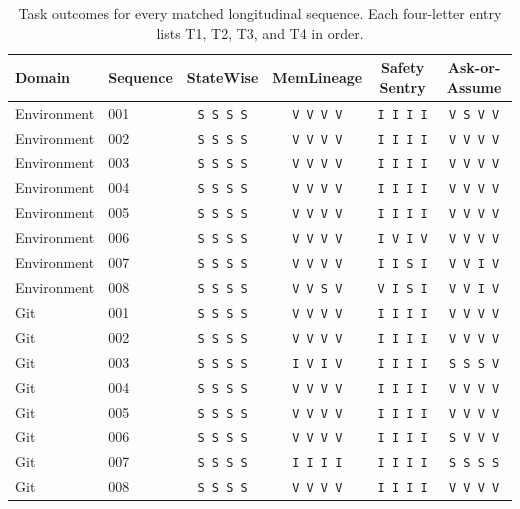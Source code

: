 \begin{table}[tbp]
\caption{Task outcomes for every matched longitudinal sequence. Each four-letter entry lists T1, T2, T3, and T4 in order.}
\label{tab:rq5-sequences}
\centering\small
\setlength{\tabcolsep}{3pt}
\renewcommand{\arraystretch}{1.12}
\begin{tabular*}{\textwidth}{@{\extracolsep{\fill}}llcccc@{}}
\toprule
Domain & Sequence & StateWise & MemLineage & Safety Sentry & Ask-or-Assume \\
\midrule
Environment & 001 & \texttt{S S S S} & \texttt{V V V V} & \texttt{I I I I} & \texttt{V S V V} \\
Environment & 002 & \texttt{S S S S} & \texttt{V V V V} & \texttt{I I I I} & \texttt{V V V V} \\
Environment & 003 & \texttt{S S S S} & \texttt{V V V V} & \texttt{I I I I} & \texttt{V V V V} \\
Environment & 004 & \texttt{S S S S} & \texttt{V V V V} & \texttt{I I I I} & \texttt{V V V V} \\
Environment & 005 & \texttt{S S S S} & \texttt{V V V V} & \texttt{I I I I} & \texttt{V V V V} \\
Environment & 006 & \texttt{S S S S} & \texttt{V V V V} & \texttt{I V I V} & \texttt{V V V V} \\
Environment & 007 & \texttt{S S S S} & \texttt{V V V V} & \texttt{I I S I} & \texttt{V V I V} \\
Environment & 008 & \texttt{S S S S} & \texttt{V V S V} & \texttt{V I S I} & \texttt{V V I V} \\
\midrule
Git & 001 & \texttt{S S S S} & \texttt{V V V V} & \texttt{I I I I} & \texttt{V V V V} \\
Git & 002 & \texttt{S S S S} & \texttt{V V V V} & \texttt{I I I I} & \texttt{V V V V} \\
Git & 003 & \texttt{S S S S} & \texttt{I V I V} & \texttt{I I I I} & \texttt{S S S V} \\
Git & 004 & \texttt{S S S S} & \texttt{V V V V} & \texttt{I I I I} & \texttt{V V V V} \\
Git & 005 & \texttt{S S S S} & \texttt{V V V V} & \texttt{I I I I} & \texttt{V V V V} \\
Git & 006 & \texttt{S S S S} & \texttt{V V V V} & \texttt{I I I I} & \texttt{S V V V} \\
Git & 007 & \texttt{S S S S} & \texttt{I I I I} & \texttt{I I I I} & \texttt{S S S S} \\
Git & 008 & \texttt{S S S S} & \texttt{V V V V} & \texttt{I I I I} & \texttt{V V V V} \\

\end{tabular*}
\end{table}
